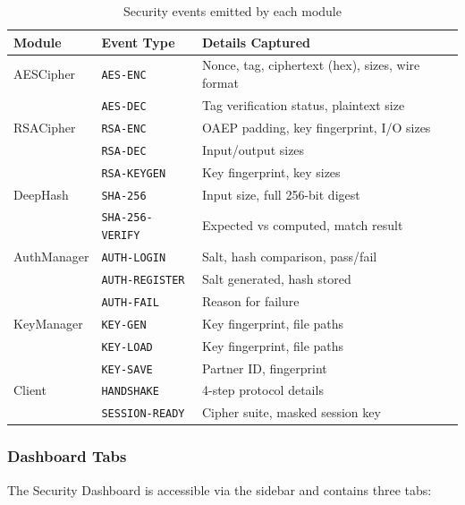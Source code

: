 \documentclass[12pt,a4paper]{article}
\begin{document}
\begin{table}[H]
\centering
\caption{Security events emitted by each module}
\begin{tabular}{@{}llp{6.5cm}@{}}
\toprule
\textbf{Module} & \textbf{Event Type} & \textbf{Details Captured} \\
\midrule
AESCipher    & \texttt{AES-ENC}  & Nonce, tag, ciphertext (hex), sizes, wire format \\
             & \texttt{AES-DEC}  & Tag verification status, plaintext size \\
\addlinespace
RSACipher    & \texttt{RSA-ENC}  & OAEP padding, key fingerprint, I/O sizes \\
             & \texttt{RSA-DEC}  & Input/output sizes \\
             & \texttt{RSA-KEYGEN} & Key fingerprint, key sizes \\
\addlinespace
DeepHash     & \texttt{SHA-256}  & Input size, full 256-bit digest \\
             & \texttt{SHA-256-VERIFY} & Expected vs computed, match result \\
\addlinespace
AuthManager  & \texttt{AUTH-LOGIN}     & Salt, hash comparison, pass/fail \\
             & \texttt{AUTH-REGISTER}  & Salt generated, hash stored \\
             & \texttt{AUTH-FAIL}      & Reason for failure \\
\addlinespace
KeyManager   & \texttt{KEY-GEN}   & Key fingerprint, file paths \\
             & \texttt{KEY-LOAD}  & Key fingerprint, file paths \\
             & \texttt{KEY-SAVE}  & Partner ID, fingerprint \\
\addlinespace
Client       & \texttt{HANDSHAKE} & 4-step protocol details \\
             & \texttt{SESSION-READY} & Cipher suite, masked session key \\
\bottomrule
\end{tabular}
\end{table}

\subsubsection{Dashboard Tabs}

The Security Dashboard is accessible via the sidebar and contains three tabs:
\end{document}
